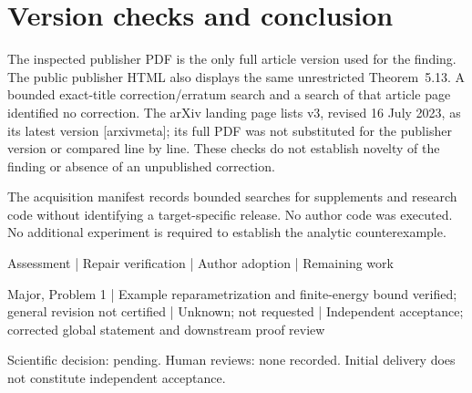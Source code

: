 \documentclass[10pt]{article}
\begin{document}
\section*{Version checks and conclusion}
The inspected publisher PDF is the only full article version used for the finding. The public publisher HTML also displays the same unrestricted Theorem 5.13. A bounded exact-title correction/erratum search and a search of that article page identified no correction. The arXiv landing page lists v3, revised 16 July 2023, as its latest version [arxivmeta]; its full PDF was not substituted for the publisher version or compared line by line. These checks do not establish novelty of the finding or absence of an unpublished correction.\par
The acquisition manifest records bounded searches for supplements and research code without identifying a target-specific release. No author code was executed. No additional experiment is required to establish the analytic counterexample.\par
Assessment | Repair verification | Author adoption | Remaining work\par
Major, Problem 1 | Example reparametrization and finite-energy bound verified; general revision not certified | Unknown; not requested | Independent acceptance; corrected global statement and downstream proof review\par
Scientific decision: pending. Human reviews: none recorded. Initial delivery does not constitute independent acceptance.\par
\end{document}

